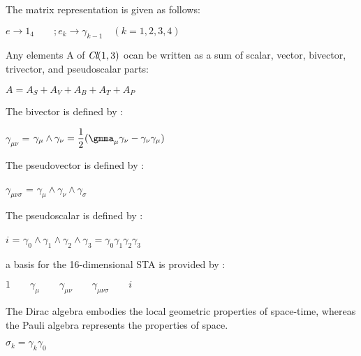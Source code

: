 \begin{frame}[allowframebreaks]
\begin{enumerate}
\begin{center}
\end{center}
 The matrix representation is given  as follows:
 \begin{center}
$e\longrightarrow 1_4 \qquad ; e_k\longrightarrow \gamma_{k-1} \quad (k=1,2,3,4)  $
\end{center}
Any   elements A of  $\emph{Cl}(1,3)$ ocan be written as a sum of scalar, vector, bivector, trivector,
and pseudoscalar parts:
\begin{center}
$A = A_S + A_V + A_B + A_T + A_P $
\end{center}
The bivector is defined by :
\begin{center}
  $\gamma_{\mu\nu}$ = $\gamma_{\mu}\wedge\gamma_{\nu}= \dfrac{1}{2}(\gmma_{\mu}\gamma_{\nu}-\gamma_{\nu}\gamma_{\mu}) $ 
\end{center}
The pseudovector is defined by :
\begin{center}
$\gamma_{\mu\nu\sigma}$ = $\gamma_{\mu}\wedge\gamma_{\nu}\wedge\gamma_{\sigma}$
\end{center}
The pseudoscalar is defined by :
\begin{center}
$i$ = $\gamma_{0}\wedge\gamma_{1}\wedge\gamma_{2}\wedge\gamma_{3}= \gamma_{0}\gamma_{1}\gamma_{2}\gamma_{3} $ 
\end{center}
a basis for the 16-dimensional STA is provided by :
\begin{center}
$ 1 \qquad \gamma_\mu \qquad \gamma_{\mu\nu} \qquad \gamma_{\mu\nu\sigma} \qquad i$
\end{center}

{\color{blue} The Dirac algebra embodies the local geometric properties of space-time, whereas the Pauli algebra represents the properties of space}. %

\begin{center}
              $ \sigma_k= \gamma_k \gamma_0$
\end{center}

   
\end{enumerate}
\end{frame}
